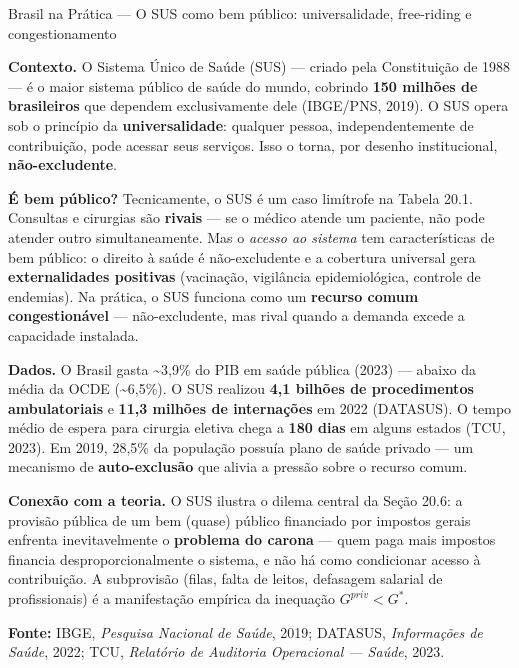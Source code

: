 \documentclass[11pt,twoside,openright]{book}
\begin{document}
\begin{boxbrasilbox}{Brasil na Prática — O SUS como bem público: universalidade, free-riding e congestionamento}

\textbf{Contexto.} O Sistema Único de Saúde (SUS) --- criado pela
Constituição de 1988 --- é o maior sistema público de saúde do mundo,
cobrindo \textbf{150 milhões de brasileiros} que dependem exclusivamente
dele (IBGE/PNS, 2019). O SUS opera sob o princípio da
\textbf{universalidade}: qualquer pessoa, independentemente de
contribuição, pode acessar seus serviços. Isso o torna, por desenho
institucional, \textbf{não-excludente}.

\textbf{É bem público?} Tecnicamente, o SUS é um caso limítrofe na
Tabela 20.1. Consultas e cirurgias são \textbf{rivais} --- se o médico
atende um paciente, não pode atender outro simultaneamente. Mas o
\emph{acesso ao sistema} tem características de bem público: o direito à
saúde é não-excludente e a cobertura universal gera
\textbf{externalidades positivas} (vacinação, vigilância epidemiológica,
controle de endemias). Na prática, o SUS funciona como um
\textbf{recurso comum congestionável} --- não-excludente, mas rival
quando a demanda excede a capacidade instalada.

\textbf{Dados.} O Brasil gasta \textasciitilde3,9\% do PIB em saúde
pública (2023) --- abaixo da média da OCDE (\textasciitilde6,5\%). O SUS
realizou \textbf{4,1 bilhões de procedimentos ambulatoriais} e
\textbf{11,3 milhões de internações} em 2022 (DATASUS). O tempo médio de
espera para cirurgia eletiva chega a \textbf{180 dias} em alguns estados
(TCU, 2023). Em 2019, 28,5\% da população possuía plano de saúde privado
--- um mecanismo de \textbf{auto-exclusão} que alivia a pressão sobre o
recurso comum.

\textbf{Conexão com a teoria.} O SUS ilustra o dilema central da Seção
20.6: a provisão pública de um bem (quase) público financiado por
impostos gerais enfrenta inevitavelmente o \textbf{problema do carona}
--- quem paga mais impostos financia desproporcionalmente o sistema, e
não há como condicionar acesso à contribuição. A subprovisão (filas,
falta de leitos, defasagem salarial de profissionais) é a manifestação
empírica da inequação \(G^{priv} < G^*\).

\textbf{Fonte:} IBGE, \emph{Pesquisa Nacional de Saúde}, 2019; DATASUS,
\emph{Informações de Saúde}, 2022; TCU, \emph{Relatório de Auditoria
Operacional --- Saúde}, 2023.

\end{boxbrasilbox}
\end{document}
